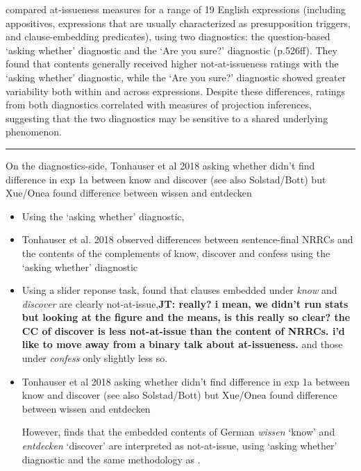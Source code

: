 \documentclass[times,linguex,xcolor]{glossa}
\newcommand{\jt}[1]{\textbf{\color{orange}JT: #1}}
\begin{document}
  \citealt{tonhauser_how_2018} compared at-issueness measures for a range of 19 English expressions (including appositives, expressions that are usually characterized as presupposition triggers, and clause-embedding predicates), using two diagnostics: the question-based `asking whether' diagnostic and the `Are you sure?' diagnostic (p.526ff). They found that contents generally received higher not-at-issueness ratings with the `asking whether' diagnostic, while the `Are you sure?' diagnostic showed greater variability both within and across expressions. Despite these differences, ratings from both diagnostics correlated with measures of projection inferences, suggesting that the two diagnostics may be sensitive to a shared underlying phenomenon.
  
  \smallskip \hrule\smallskip
  On the diagnostics-side, Tonhauser et al 2018 asking whether didn’t find difference in exp 1a between know and discover (see also Solstad/Bott) but Xue/Onea found difference between wissen and entdecken

  \begin{itemize}
    \item Using the `asking whether' diagnostic, 
    \item  Tonhauser et al. 2018 observed differences between sentence-final NRRCs and the contents of the complements of know, discover and confess using the ‘asking whether’ diagnostic

    \item Using a slider reponse task, \citealt{tonhauser_how_2018} found that clauses embedded under \emph{know} and \emph{discover} are clearly not-at-issue,\jt{really? i mean, we didn't run stats but looking at the figure and the means, is this really so clear? the CC of discover is less not-at-issue than the content of NRRCs. i'd like to move away from a binary talk about at-issueness.} and those under \emph{confess} only slightly less so.

    \item Tonhauser et al 2018 asking whether didn't find difference in exp 1a between know and discover (see also Solstad/Bott) but Xue/Onea found difference between wissen and entdecken

    However, \citealt{solstad_cataphoric_2024} finds that the embedded contents of German \emph{wissen} `know' and \emph{entdecken} `discover' are interpreted as not-at-issue, using `asking whether' diagnostic and the same methodology as \citealt{tonhauser_how_2018,degen-tonhauser-glossa}.

  \end{itemize}
\end{document}
